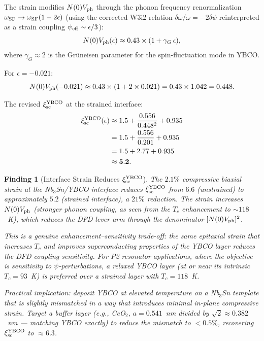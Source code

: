 \documentclass[11pt]{article}
\newtheorem{finding}{Finding}
\begin{document}
The strain modifies $N(0)V_{\rm ph}$ through the phonon frequency
renormalization $\omega_{\rm SF} \to \omega_{\rm SF}(1 - 2\epsilon)$
(using the corrected W3i2 relation $\delta\omega/\omega = -2\delta\psi$
reinterpreted as a strain coupling $\psi_{\rm eff} \sim \epsilon/3$):
\begin{equation}
N(0)V_{\rm ph}(\epsilon) \approx 0.43 \times (1 + \gamma_G\,\epsilon),
\label{eq:NVph-strain}
\end{equation}
where $\gamma_G \approx 2$ is the Gr\"uneisen parameter for the spin-fluctuation
mode in YBCO.

For $\epsilon = -0.021$:
\begin{equation}
N(0)V_{\rm ph}(-0.021) \approx 0.43 \times (1 + 2 \times 0.021) = 0.43 \times 1.042 = 0.448.
\label{eq:NVph-strained}
\end{equation}

The revised $\xi_{\rm sc}^{\rm YBCO}$ at the strained interface:
\begin{align}
\xi_{\rm sc}^{\rm YBCO}(\epsilon) &\approx 1.5 + \frac{0.556}{0.448^2} + 0.935 \notag\\
&= 1.5 + \frac{0.556}{0.201} + 0.935 \notag\\
&= 1.5 + 2.77 + 0.935 \notag\\
&\approx \mathbf{5.2}.
\label{eq:xi-YBCO-strained}
\end{align}

\begin{finding}[Interface Strain Reduces $\xi_{\rm sc}^{\rm YBCO}$]
\label{finding:strain}
The $2.1\%$ compressive biaxial strain at the Nb$_3$Sn/YBCO interface
reduces $\xi_{\rm sc}^{\rm YBCO}$ from $6.6$ (unstrained) to approximately
$5.2$ (strained interface), a $21\%$ reduction. The strain increases
$N(0)V_{\rm ph}$ (stronger phonon coupling, as seen from the $T_c$ enhancement
to $\sim 118$~K), which reduces the DFD lever arm through the denominator
$[N(0)V_{\rm ph}]^2$.

This is a genuine \emph{enhancement--sensitivity trade-off}: the same
epitaxial strain that increases $T_c$ and improves superconducting properties
of the YBCO layer \emph{reduces} the DFD coupling sensitivity. For P2
resonator applications, where the objective is sensitivity to $\psi$-perturbations,
a \emph{relaxed} YBCO layer (at or near its intrinsic $T_c = 93$~K) is
preferred over a strained layer with $T_c = 118$~K.

Practical implication: deposit YBCO at elevated temperature on a Nb$_3$Sn
template that is slightly mismatched in a way that introduces minimal
in-plane compressive strain. Target a buffer layer (e.g., CeO$_2$, $a = 0.541$~nm
divided by $\sqrt{2} \approx 0.382$~nm --- matching YBCO exactly) to reduce
the mismatch to $< 0.5\%$, recovering $\xi_{\rm sc}^{\rm YBCO}$ to
$\approx 6.3$.
\end{finding}
\end{document}
